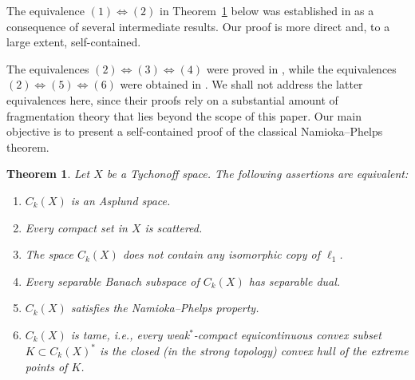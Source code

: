 \documentclass[12pt]{amsart}
\theoremstyle{plain}
\newtheorem{theorem}{Theorem}[section]
\theoremstyle{definition}
\theoremstyle{remark}
\begin{document}
The equivalence $(1)\Leftrightarrow(2)$ in Theorem~\ref{MAIN} below was established in \cite[Corollary 3.8]{es} as a consequence of several intermediate results. Our proof is more direct and, to a large extent, self-contained.

The equivalences $(2)\Leftrightarrow(3)\Leftrightarrow(4)$ were proved in \cite{GKKM}, while the equivalences $(2)\Leftrightarrow(5)\Leftrightarrow(6)$ were obtained in \cite{KM}.
We shall not address the latter equivalences here, since their proofs rely on a substantial amount of fragmentation theory that lies beyond the scope of this paper. Our main objective is to present a self-contained proof of the classical Namioka--Phelps theorem.
\begin{theorem}\label{MAIN}
Let $X$ be a Tychonoff space. The following assertions are equivalent:
\begin{enumerate}
\item   $C_k(X)$ is an Asplund space.
\item   Every compact set in $X$ is scattered.
\item  The space $C_k(X)$ does not contain any isomorphic copy of $\ell_{1}$.
\item Every separable Banach subspace of $C_k(X)$ has separable dual.
\item $C_k(X)$ satisfies the Namioka--Phelps property.
\item $C_k(X)$ is tame, i.e., every weak$^{*}$-compact equicontinuous convex subset $K\subset C_k(X)^*$ is the closed (in the strong  topology) convex hull of the extreme points of $K$.
\end{enumerate}
\end{theorem}
\end{document}
